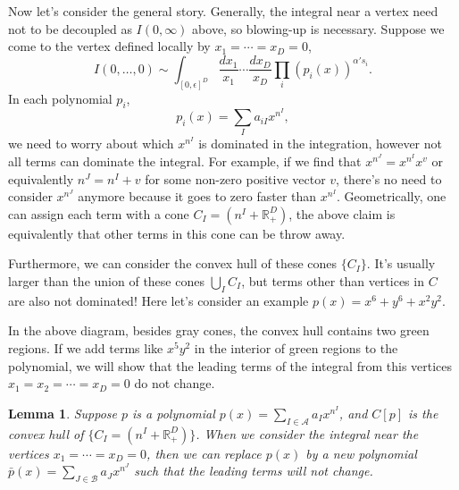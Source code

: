 \documentclass[12pt]{article}
\theoremstyle{definition}
\theoremstyle{plain}
\newtheorem{lem}[para]{Lemma}
\begin{document}
Now let's consider the general story. Generally, the integral near a vertex need not to be decoupled as $I(0,\infty)$ above, so blowing-up is necessary. Suppose we come to the vertex defined locally by $x_1=\cdots=x_D=0$, 
\[
	I(0,\dots,0)\sim \int_{[0,\epsilon]^D} \frac{d x_1}{x_1}\cdots \frac{d x_D}{x_D} \prod_i(p_i(x))^{\alpha' s_i}.
\]
In each polynomial $p_i$, 
\[
	p_i(x)=\sum_{I} a_{iI} x^{n^I},
\]
we need to worry about which $x^{n^I}$ is dominated in the integration, however not all terms can dominate 
the integral. For example, if we find that $x^{n^J}=x^{n^I}x^{v}$ or equivalently $n^J=n^I+v$ for some 
non-zero positive vector $v$, there's no need to consider $x^{n^J}$ anymore because it goes to zero faster 
than $x^{n^I}$. Geometrically, one can assign each term with a cone $C_{I}=(n^I+\mathbb R^D_{+})$, the above
claim is equivalently that other terms in this cone can be throw away.

Furthermore, we can consider the convex hull of these cones $\{C_I\}$. It's usually larger than
the union of these cones $\bigcup_I C_I$, but terms other than vertices in $C$ are also not dominated!
Here let's consider an example $p(x)=x^6+y^6+x^2y^2$. 
\begin{center}
\end{center}
In the above diagram, besides gray cones, the convex hull contains two green regions. 
If we add terms like $x^5y^2$ in the interior of green regions to the polynomial, 
we will show that the leading terms of the integral from this vertices $x_1=x_2=\cdots=x_D=0$
do not change.

\begin{lem}
Suppose $p$ is a polynomial $p(x)=\sum_{I\in \mathscr A}a_I x^{n^I}$, and $C[p]$ is the convex hull
of $\{C_{I}=(n^I+\mathbb R^D_{+})\}$. When we consider the integral near the vertices $x_1=\cdots=x_D=0$, 
then we can replace $p(x)$ by a new polynomial $\bar p(x)=\sum_{J\in \mathscr B}a_J x^{n^J}$ such that
the leading terms will not change.
\end{lem}
\end{document}
